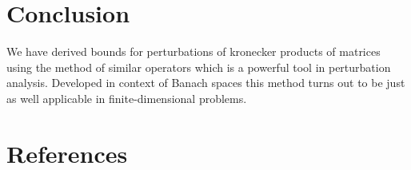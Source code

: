\documentclass[a4paper]{jpconf}
\begin{document}
\section*{Conclusion}
We have derived bounds
    for perturbations of kronecker products
    of matrices
    using the method of similar operators
    which is a powerful tool in perturbation analysis.
Developed in context of Banach spaces
    this method turns out to be just as well applicable
    in finite-dimensional problems.
\section*{References}

{}
\end{document}
